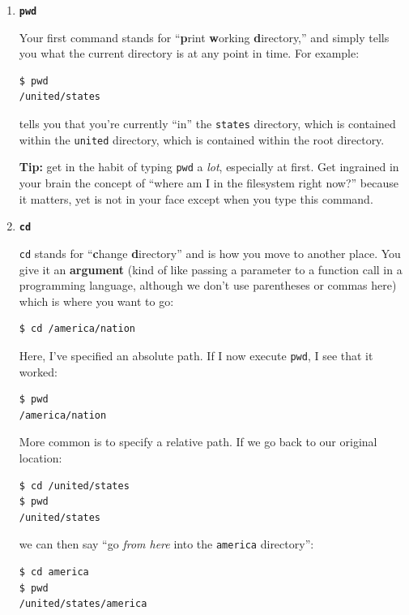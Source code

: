 \begin{enumerate}
\itemsep.1em
\item \textbf{\texttt{pwd}}

Your first command stands for ``\textbf{p}rint \textbf{w}orking
\textbf{d}irectory,'' and simply tells you what the current directory is at any
point in time. For example:

\begin{verbatim}
$ pwd
/united/states
\end{verbatim}

tells you that you're currently ``in'' the \texttt{states} directory, which is
contained within the \texttt{united} directory, which is contained within the
root directory.

\textbf{Tip:} get in the habit of typing \texttt{pwd} a \textit{lot},
especially at first. Get ingrained in your brain the concept of ``where am I
in the filesystem right now?'' because it matters, yet is not in your face
except when you type this command.

\bigline
\item \textbf{\texttt{cd}}

\texttt{cd} stands for ``\textbf{c}hange \textbf{d}irectory'' and is how you
move to another place. You give it an \textbf{argument} (kind of like passing
a parameter to a function call in a programming language, although we don't
use parentheses or commas here) which is where you want to go:

\begin{verbatim}
$ cd /america/nation
\end{verbatim}

Here, I've specified an absolute path. If I now execute \texttt{pwd}, I see
that it worked:
\begin{verbatim}
$ pwd
/america/nation
\end{verbatim}

More common is to specify a relative path. If we go back to our original
location:

\begin{verbatim}
$ cd /united/states
$ pwd
/united/states
\end{verbatim}

we can then say ``go \textit{from here} into the \texttt{america} directory'':

\begin{verbatim}
$ cd america
$ pwd
/united/states/america
\end{verbatim}


\end{enumerate}
